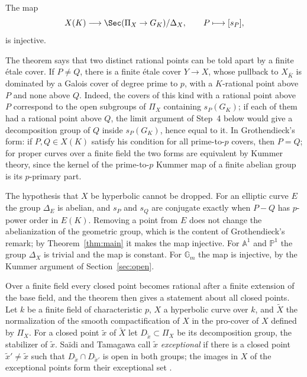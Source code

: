 \begin{theorem}\label{thm:main}
The map
\[
 X(K)\longrightarrow \Sec(\Pi_X\to G_K)/\Delta_X,\qquad P\longmapsto[s_P],
\]
is injective.
\end{theorem}

The theorem says that two distinct rational points can be told apart by a finite \'etale cover. If $P\ne Q$, there is a finite \'etale cover $Y\to X$, whose pullback to $X_{\overline K}$ is dominated by a Galois cover of degree prime to $p$, with a $K$-rational point above $P$ and none above $Q$. Indeed, the covers of this kind with a rational point above $P$ correspond to the open subgroups of $\Pi_X$ containing $s_P(G_K)$; if each of them had a rational point above $Q$, the limit argument of Step~4 below would give a decomposition group of $Q$ inside $s_P(G_K)$, hence equal to it. In Grothendieck's form: if $P,Q\in X(K)$ satisfy his condition for all prime-to-$p$ covers, then $P=Q$; for proper curves over a finite field the two forms are equivalent by Kummer theory, since the kernel of the prime-to-$p$ Kummer map of a finite abelian group is its $p$-primary part.

The hypothesis that $X$ be hyperbolic cannot be dropped. For an elliptic curve $E$ the group $\Delta_E$ is abelian, and $s_P$ and $s_Q$ are conjugate exactly when $P-Q$ has $p$-power order in $E(K)$. Removing a point from $E$ does not change the abelianization of the geometric group, which is the content of Grothendieck's remark; by Theorem~\ref{thm:main} it makes the map injective. For $\mathbb A^1$ and $\mathbb P^1$ the group $\Delta_X$ is trivial and the map is constant. For $\mathbb G_m$ the map is injective, by the Kummer argument of Section~\ref{sec:open}.

Over a finite field every closed point becomes rational after a finite extension of the base field, and the theorem then gives a statement about all closed points. Let $k$ be a finite field of characteristic $p$, $X$ a hyperbolic curve over $k$, and $\widetilde X$ the normalization of the smooth compactification of $X$ in the pro-cover of $X$ defined by $\Pi_X$. For a closed point $\tilde x$ of $\widetilde X$ let $D_{\tilde x}\subset\Pi_X$ be its decomposition group, the stabilizer of $\tilde x$. Sa\"idi and Tamagawa call $\tilde x$ \emph{exceptional} if there is a closed point $\tilde x'\ne\tilde x$ such that $D_{\tilde x}\cap D_{\tilde x'}$ is open in both groups; the images in $X$ of the exceptional points form their exceptional set \cite[Definitions 1.3, 1.5, 1.10]{ST09}.

